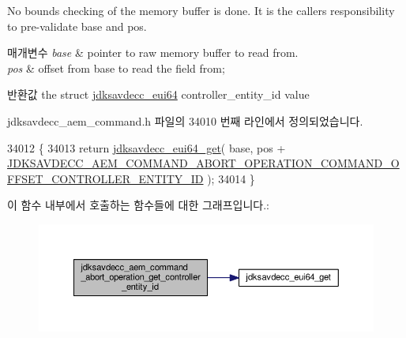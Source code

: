 No bounds checking of the memory buffer is done. It is the caller\textquotesingle{}s responsibility to pre-\/validate base and pos.


\begin{DoxyParams}{매개변수}
{\em base} & pointer to raw memory buffer to read from. \\
\hline
{\em pos} & offset from base to read the field from; \\
\hline
\end{DoxyParams}
\begin{DoxyReturn}{반환값}
the struct \hyperlink{structjdksavdecc__eui64}{jdksavdecc\+\_\+eui64} controller\+\_\+entity\+\_\+id value 
\end{DoxyReturn}


jdksavdecc\+\_\+aem\+\_\+command.\+h 파일의 34010 번째 라인에서 정의되었습니다.


\begin{DoxyCode}
34012 \{
34013     \textcolor{keywordflow}{return} \hyperlink{group__eui64_ga2652311a25a6b91cddbed75c108c7031}{jdksavdecc\_eui64\_get}( base, pos + 
      \hyperlink{group__command__abort__operation_gad6dce81d2dcb8e0ef47feac71dab73fb}{JDKSAVDECC\_AEM\_COMMAND\_ABORT\_OPERATION\_COMMAND\_OFFSET\_CONTROLLER\_ENTITY\_ID}
       );
34014 \}
\end{DoxyCode}


이 함수 내부에서 호출하는 함수들에 대한 그래프입니다.\+:
\nopagebreak
\begin{figure}[H]
\begin{center}
\leavevmode
\includegraphics[width=350pt]{group__command__abort__operation_ga212c8b390e1a1306f97b21e7fc58fa2e_cgraph}
\end{center}
\end{figure}


